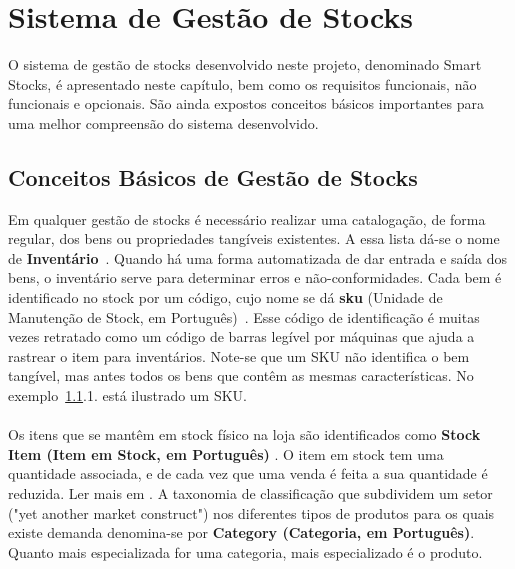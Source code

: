 %
%
\chapter{Sistema de Gestão de Stocks} \label{cap2}

O sistema de gestão de stocks desenvolvido neste projeto, denominado Smart Stocks, é apresentado neste capítulo, bem como os requisitos funcionais, não funcionais e opcionais. São ainda expostos conceitos básicos importantes para uma melhor compreensão do sistema desenvolvido.

\section{Conceitos Básicos de Gestão de Stocks} \label{sec21}
Em qualquer gestão de stocks é necessário realizar uma catalogação, de forma regular, dos bens ou propriedades tangíveis existentes. A essa lista dá-se o nome de \textbf{Inventário}~\cite{businessDictionary:invetoryDefinition2018}. Quando há uma forma automatizada de dar entrada e saída dos bens, o inventário serve para determinar erros e não-conformidades. 
Cada bem é identificado no stock por um código, cujo nome se dá \textbf{\acrfull{sku}} (Unidade de Manutenção de Stock, em Português)~\cite{investopedia:skuDefinition2018}. Esse código de identificação é muitas vezes retratado como um código de barras legível por máquinas que ajuda a rastrear o item para inventários. Note-se que um SKU não identifica o bem tangível, mas antes todos os bens que contêm as mesmas características. No exemplo~\ref{sec21}.1. está ilustrado um SKU.\\[0.25cm]

\noindent{}\\[0.25cm]

Os itens que se mantêm em stock físico na loja são identificados como \textbf{Stock Item (Item em Stock, em Português)} \cite{sphereoi:itemIdentification2018}. O item em stock tem uma quantidade associada, e de cada vez que uma venda é feita a sua quantidade é reduzida. Ler mais em \cite{phostersoft:stockItemDefinition2018}.
A taxonomia de classificação que subdividem um setor ("yet another market construct") nos diferentes tipos de produtos para os quais existe demanda denomina-se por \textbf{Category (Categoria, em Português)}. Quanto mais especializada for uma categoria, mais especializado é o produto.

